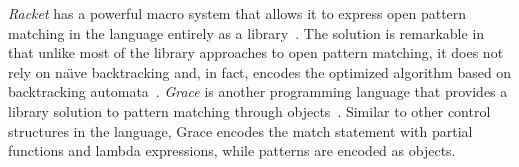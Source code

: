 %
\emph{Racket} has a powerful macro system that allows it to express open pattern 
matching in the language entirely as a library~\cite{Tobin-Hochstadt_2010}. 
The solution is remarkable in that unlike most of the library approaches to open pattern matching, 
it does not rely on na{\"\i}ve backtracking and, in fact, encodes the optimized 
algorithm based on backtracking automata~\cite{Augustsson85,OPM01}. %
%
\emph{Grace} is another programming language that provides a library solution to 
pattern matching through objects~\cite{Grace2012}. Similar to other control 
structures in the language, Grace encodes the match statement with partial 
functions and lambda expressions, while patterns are encoded as objects. 


